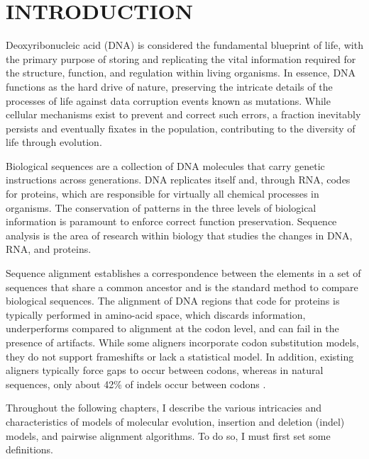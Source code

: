 \chapter{INTRODUCTION}
\label{ch:intro}

Deoxyribonucleic acid (DNA) is considered the fundamental blueprint of life, with the primary purpose of storing and replicating the vital information required for the structure, function, and regulation within living organisms. In essence, DNA functions as the hard drive of nature, preserving the intricate details of the processes of life against data corruption events known as mutations. While cellular mechanisms exist to prevent and correct such errors, a fraction inevitably persists and eventually fixates in the population, contributing to the diversity of life through evolution.

Biological sequences are a collection of DNA molecules that carry genetic instructions across generations. DNA replicates itself and, through RNA, codes for proteins, which are responsible for virtually all chemical processes in organisms. The conservation of patterns in the three levels of biological information is paramount to enforce correct function preservation. Sequence analysis is the area of research within biology that studies the changes in DNA, RNA, and proteins.

Sequence alignment establishes a correspondence between the elements in a set of sequences that share a common ancestor and is the standard method to compare biological sequences. The alignment of DNA regions that code for proteins is typically performed in amino-acid space, which discards information, underperforms compared to alignment at the codon level, and can fail in the presence of artifacts. While some aligners incorporate codon substitution models, they do not support frameshifts or lack a statistical model. In addition, existing aligners typically force gaps to occur between codons, whereas in natural sequences, only about 42\% of indels occur between codons \citep{taylor2004occurrence,zhu2022profiling}.

Throughout the following chapters, I describe the various intricacies and characteristics of models of molecular evolution, insertion and deletion (indel) models, and pairwise alignment algorithms. To do so, I must first set some definitions.


